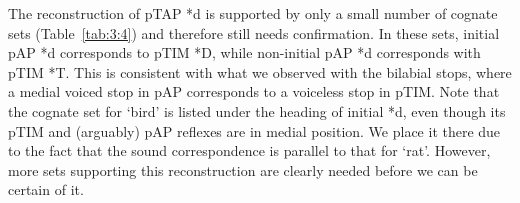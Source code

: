 The reconstruction of pTAP *d is supported by only a small number of cognate sets (Table~\ref{tab:3:4}) and therefore still needs confirmation. In these sets, initial pAP *d corresponds to pTIM *D, while non-initial pAP *d corresponds with pTIM *T. This is consistent with what we observed with the bilabial stops, where a medial voiced stop in pAP corresponds to a voiceless stop in pTIM. Note that the cognate set for `bird' is listed under the heading of initial *d, even though its pTIM and (arguably) pAP reflexes are in medial position. We place it there due to the fact that the sound correspondence is parallel to that for `rat'. However, more sets supporting this reconstruction are clearly needed before we can be certain of it. 
 
